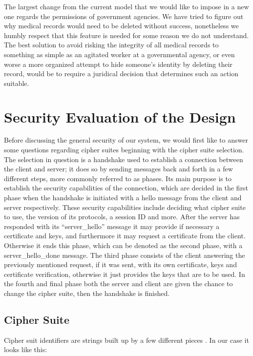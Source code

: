 \documentclass{article}
\begin{document}
The largest change from the current model that we would like to impose in a new one regards the permissions of government agencies. We have tried to figure out why medical records would need to be deleted without success, nonetheless we humbly respect that this feature is needed for some reason we do not understand. The best solution to avoid risking the integrity of all medical records to something as simple as an agitated worker at a governmental agency, or even worse a more organized attempt to hide someone's identity by deleting their record, would be to require a juridical decision that determines such an action suitable. 

\section*{Security Evaluation of the Design}
Before discussing the general security of our system, we would first like to answer some questions regarding cipher suites beginning with the cipher suite selection. The selection in question is a handshake used to establish a connection between the client and server; it does so by sending messages back and forth in a few different steps, more commonly referred to as phases. Its main purpose is to establish the security capabilities of the connection, which are decided in the first phase when the handshake is initiated with a hello message from the client and server respectively. These security capabilities include deciding what cipher suite to use, the version of its protocols, a session ID and more. After the server has responded with its “server\_hello” message it may provide if necessary a certificate and keys, and furthermore it may request a certificate from the client. Otherwise it ends this phase, which can be denoted as the second phase, with a server\_hello\_done message. The third phase consists of the client answering the previously mentioned request, if it was sent, with its own certificate, keys and certificate verification, otherwise it just provides the keys that are to be used. In the fourth and final phase both the server and client are given the chance to change the cipher suite, then the handshake is finished.\cite{stalbrown}

\subsection*{Cipher Suite}

Cipher suit identifiers are strings built up by a few different pieces\cite{microCipher} . In our case it looks like this:
\end{document}
